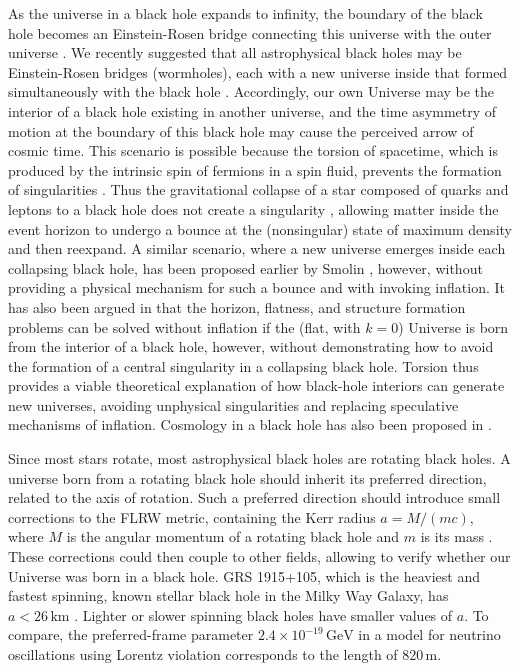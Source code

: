 \documentclass[prd,onecolumn,nofootinbib,showkeys]{revtex4}
\begin{document}
As the universe in a black hole expands to infinity, the boundary of the black hole becomes an Einstein-Rosen bridge connecting this universe with the outer universe \cite{ER}.
We recently suggested that all astrophysical black holes may be Einstein-Rosen bridges (wormholes), each with a new universe inside that formed simultaneously with the black hole \cite{Niko1}.
Accordingly, our own Universe may be the interior of a black hole existing in another universe, and the time asymmetry of motion at the boundary of this black hole may cause the perceived arrow of cosmic time.
This scenario is possible because the torsion of spacetime, which is produced by the intrinsic spin of fermions in a spin fluid, prevents the formation of singularities \cite{HHK}.
Thus the gravitational collapse of a star composed of quarks and leptons to a black hole does not create a singularity \cite{Niko2}, allowing matter inside the event horizon to undergo a bounce at the (nonsingular) state of maximum density and then reexpand.
A similar scenario, where a new universe emerges inside each collapsing black hole, has been proposed earlier by Smolin \cite{Smo1,Smo2}, however, without providing a physical mechanism for such a bounce and with invoking inflation.
It has also been argued in \cite{EB} that the horizon, flatness, and structure formation problems can be solved without inflation if the (flat, with $k=0$) Universe is born from the interior of a black hole, however, without demonstrating how to avoid the formation of a central singularity in a collapsing black hole.
Torsion thus provides a viable theoretical explanation of how black-hole interiors can generate new universes, avoiding unphysical singularities and replacing speculative mechanisms of inflation.
Cosmology in a black hole has also been proposed in \cite{BGG,ST}.

Since most stars rotate, most astrophysical black holes are rotating black holes.
A universe born from a rotating black hole should inherit its preferred direction, related to the axis of rotation.
Such a preferred direction should introduce small corrections to the FLRW metric, containing the Kerr radius $a=M/(mc)$, where $M$ is the angular momentum of a rotating black hole and $m$ is its mass \cite{LL,Kerr}.
These corrections could then couple to other fields, allowing to verify whether our Universe was born in a black hole.
GRS 1915+105, which is the heaviest and fastest spinning, known stellar black hole in the Milky Way Galaxy, has $a<26\,\mbox{km}$ \cite{puls}.
Lighter or slower spinning black holes have smaller values of $a$.
To compare, the preferred-frame parameter $2.4\times10^{-19}\,\mbox{GeV}$ in a model for neutrino oscillations using Lorentz violation \cite{Tep} corresponds to the length of $820\,\mbox{m}$.
\end{document}
